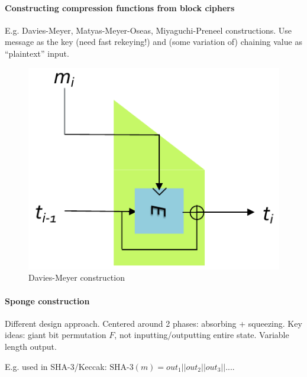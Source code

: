 \paragraph{Constructing compression functions from block ciphers}
E.g. Davies-Meyer, Matyas-Meyer-Oseas, Miyaguchi-Preneel constructions.
Use message as the key (need fast rekeying!) and (some variation of) chaining value as ``plaintext'' input.

\begin{figure}[h]
    \centering
	\includegraphics[scale=0.35]{images/davies-meyer.png}
    \caption{Davies-Meyer construction}
    \label{fig:davies-meyer}
\end{figure}

\paragraph{Sponge construction}
Different design approach.
Centered around 2 phases: absorbing + squeezing.
Key ideas: giant bit permutation $F$, not inputting/outputting entire state.
Variable length output.

E.g. used in SHA-3/Keccak: $\text{SHA-3}(m)=out_1||out_2||out_3||...$.

